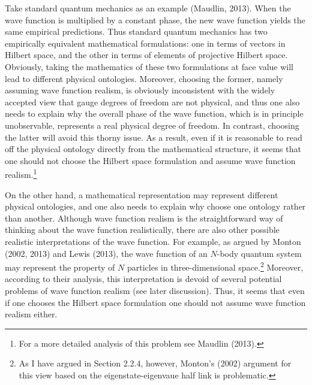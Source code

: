 Take standard quantum mechanics  as an example (Maudlin, 2013). When the wave function is multiplied by a constant phase, the new wave function yields the same empirical predictions. Thus standard quantum mechanics has two empirically equivalent mathematical formulations: one in terms of vectors in Hilbert space, and the other in terms of elements of projective Hilbert space. Obviously, taking the mathematics of these two formulations at face value will lead to different physical ontologies.  Moreover, choosing the former, namely assuming wave function realism, is obviously inconsistent with the widely accepted view that gauge degrees of freedom are not physical, and thus one also needs to explain why the overall phase of the wave function, which is in principle unobservable, represents a real physical degree of freedom. In contrast, choosing the latter will avoid this thorny issue. As a result, even if it is reasonable to read off the physical ontology directly from the mathematical structure, it seems that one should not choose the Hilbert space formulation and assume wave function realism.\footnote{For a more detailed analysis of this problem see Maudlin (2013).}


On the other hand, a mathematical representation may represent different physical ontologies, and one also  needs to explain why  choose one ontology rather than another. Although wave function realism is the straightforward way of thinking about the wave function realistically, there are also other possible realistic interpretations of the wave function. For example, as argued by Monton (2002, 2013) and Lewis (2013), the wave function of an $N$-body quantum system may represent the property of $N$ particles in three-dimensional space.\footnote{As I have argued in Section 2.2.4, however, Monton's (2002) argument for this view based on the eigenstate-eigenvaue half link is problematic.} 
Moreover, according to their analysis, this interpretation is devoid of several potential problems of wave function realism (see later discussion). Thus, it seems that even if one chooses the Hilbert space formulation one should not assume wave function realism either.

